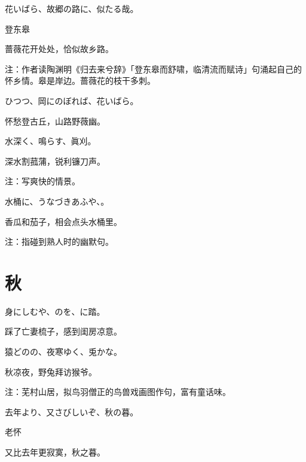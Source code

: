 \begin{haiku}
    {\FH 花いばら、故郷の路に、似たる哉。}

    {\FK 登东皋}

    {\FK 蔷薇花开处处，恰似故乡路。}

    {\FT 注：作者读陶渊明《归去来兮辞》「登东皋而舒啸，临清流而赋诗」句涌起自己的怀乡情。皋是岸边。蔷薇花的枝干多刺。}
\end{haiku}

\begin{haiku}
    {\FH {}ひつつ、岡にのぼれば、花いばら。}

    {\FK 怀愁登古丘，山路野薇幽。}
\end{haiku}

\begin{haiku}
    {\FH 水深く、鳴らす、眞刈。}

    {\FK 深水割菰蒲，锐利镰刀声。}

    {\FT 注：写爽快的情景。}
\end{haiku}

\begin{haiku}
    {\FH 水桶に、うなづきあふや、。}

    {\FK 香瓜和茄子，相会点头水桶里。}

    {\FT 注：指碰到熟人时的幽默句。}
\end{haiku}

\section{\FK 秋}

\setcounter{haikucounter}{0}

\begin{haiku}
    {\FH 身にしむや、のを、に踏。}

    {\FK 踩了亡妻梳子，感到闺房凉意。}
\end{haiku}

\begin{haiku}
    {\FH 猿どのの、夜寒ゆく、兎かな。}

    {\FK 秋凉夜，野兔拜访猴爷。}

    {\FT 注：芜村山居，拟鸟羽僧正的鸟兽戏画图作句，富有童话味。}
\end{haiku}

\begin{haiku}
    {\FH 去年より、又さびしいぞ、秋の暮。}

    {\FK 老怀}

    {\FK 又比去年更寂寞，秋之暮。}
\end{haiku}


